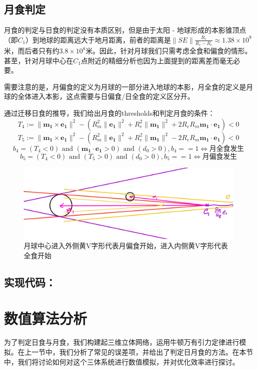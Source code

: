 \documentclass[hidelinks]{article}
\newcommand{\dps}{\displaystyle}
\newcommand{\vt}[1]{\mathbf{#1}}
\newcommand{\norm}[1]{\| #1 \|}
\newcommand{\andd}{\mbox{ and }}
\begin{document}
\subsection{月食判定}

月食的判定与日食的判定没有本质区别，但是由于太阳 - 地球形成的本影锥顶点（即$C_1$）到地球的距离远大于地月距离，前者的距离是$\dps \norm{SE}\frac{R_e}{R_s - R_e} \approx 1.38\times 10^9$米，而后者只有约$3.8\times 10^8$米。因此，针对月球我们只需考虑全食和偏食的情形。甚至，针对月球中心在$C_1$点附近的精细分析也因为上面提到的距离差而毫无必要。

需要注意的是，月偏食的定义为月球的一部分进入地球的本影，月全食的定义是月球的全体进入本影，这点需要与日偏食/日全食的定义区分开。

通过迁移日食的推导，我们给出月食的thresholds和判定月食的条件：
$$
T_4 
 := \norm{\vt{m_1} \times \vt{e_1}}^2 - (R_m^2 \norm{\vt{e_1}}^2 + R_e^2 \norm{\vt{m_1}}^2 + 2R_e R_m \vt{m_1}\cdot \vt{e_1}) < 0
$$
$$
T_5 
 := \norm{\vt{m_1} \times \vt{e_1}}^2 - (R_m^2 \norm{\vt{e_1}}^2 + R_e^2 \norm{\vt{m_1}}^2 - 2R_e R_m \vt{m_1}\cdot \vt{e_1}) < 0
$$
$$
b_4 = (T_4 < 0) \andd (\vt{m_1} \cdot \vt{e_1} > 0) \andd (d_0 > 0), b_4 == 1 \Longleftrightarrow \text{月全食发生}
$$
$$
b_5 = (T_4 < 0) \andd (T_5 > 0) \andd (d_0 > 0), b_5 == 1 \Longleftrightarrow \text{月偏食发生}
$$

\begin{figure}
    \centering
    \includegraphics[width=0.8\linewidth]{images/moon_eclipse.png}
    \caption{月球中心进入外侧黄V字形代表月偏食开始，进入内侧黄V字形代表全食开始}
    \label{fig:enter-label}
\end{figure}

\subsection{实现代码：}


\section{数值算法分析}

为了判定日食与月食，我们构建起三维立体网络，运用牛顿万有引力定律进行模拟。在上一节中，我们分析了常见的误差项，并给出了判定日月食的方法。在本节中，我们将讨论如何对这个三体系统进行数值模拟，并对优化效率进行探讨。
\end{document}
